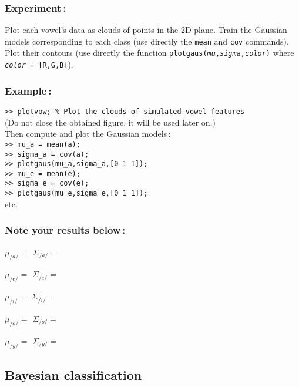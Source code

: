 \documentclass[twoside,a4paper,titlepage]{article}
\newcommand{\mat}[1]{{\tt >> #1} \\}
\newcommand{\com}[1]{{\tt #1}}
\begin{document}
\subsubsection*{Experiment\,:}
Plot each vowel's data as clouds of points in the 2D plane. Train the
Gaussian models corresponding to each class (use directly the \com{mean}
and \com{cov} commands). Plot their contours (use directly the function
\com{plotgaus({\em mu},{\em sigma},{\em color})} where \com{{\em color} =
[R,G,B]}).

\subsubsection*{Example\,:}
\mat{plotvow; \% Plot the clouds of simulated vowel features}
(Do not close the obtained figure, it will be used later on.) \\
Then compute and plot the Gaussian models\,: \\
\mat{mu\_a = mean(a);}
\mat{sigma\_a = cov(a);}
\mat{plotgaus(mu\_a,sigma\_a,[0 1 1]);}
\mat{mu\_e = mean(e);}
\mat{sigma\_e = cov(e);}
\mat{plotgaus(mu\_e,sigma\_e,[0 1 1]);}
etc.

\subsubsection*{Note your results below\,:}

\bigskip
\centerline{$\mu_{/a/} = $ \hfill $\Sigma_{/a/} =$ \hfill}

\vspace{1cm}
\centerline{$\mu_{/e/} = $ \hfill $\Sigma_{/e/} =$ \hfill}

\vspace{1cm}
\centerline{$\mu_{/i/} = $ \hfill $\Sigma_{/i/} =$ \hfill}

\vspace{1cm}
\centerline{$\mu_{/o/} = $ \hfill $\Sigma_{/o/} =$ \hfill}

\vspace{1cm}
\centerline{$\mu_{/y/} = $ \hfill $\Sigma_{/y/} =$ \hfill}

\vspace{1.5cm}

\subsection{Bayesian classification}
\end{document}
